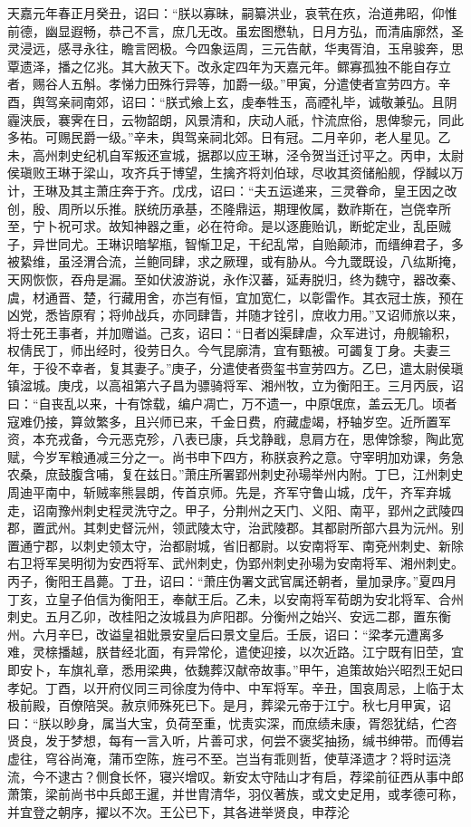 \documentclass[]{article}
\begin{document}
天嘉元年春正月癸丑，诏曰：``朕以寡昧，嗣纂洪业，哀茕在疚，治道弗昭，仰惟前德，幽显遐畅，恭己不言，庶几无改。虽宏图懋轨，日月方弘，而清庙廓然，圣灵浸远，感寻永往，瞻言罔极。今四象运周，三元告献，华夷胥洎，玉帛骏奔，思覃遗泽，播之亿兆。其大赦天下。改永定四年为天嘉元年。鳏寡孤独不能自存立者，赐谷人五斛。孝悌力田殊行异等，加爵一级。''甲寅，分遣使者宣劳四方。辛酉，舆驾亲祠南郊，诏曰：``朕式飨上玄，虔奉牲玉，高禋礼毕，诚敬兼弘。且阴霾浃辰，褰霁在日，云物韶朗，风景清和，庆动人祇，忭流庶俗，思俾黎元，同此多祐。可赐民爵一级。''辛未，舆驾亲祠北郊。日有冠。二月辛卯，老人星见。乙未，高州刺史纪机自军叛还宣城，据郡以应王琳，泾令贺当迁讨平之。丙申，太尉侯瑱败王琳于梁山，攻齐兵于博望，生擒齐将刘伯球，尽收其资储船舰，俘馘以万计，王琳及其主萧庄奔于齐。戊戌，诏曰：``夫五运递来，三灵眷命，皇王因之改创，殷、周所以乐推。朕统历承基，丕隆鼎运，期理攸属，数祚斯在，岂侥幸所至，宁卜祝可求。故知神器之重，必在符命。是以逐鹿贻讥，断蛇定业，乱臣贼子，异世同尤。王琳识暗挈瓶，智惭卫足，干纪乱常，自贻颠沛，而缙绅君子，多被絷维，虽泾渭合流，兰鲍同肆，求之厥理，或有胁从。今九罭既设，八纮斯掩，天网恢恢，吞舟是漏。至如伏波游说，永作汉蕃，延寿脱归，终为魏守，器改秦、虞，材通晋、楚，行藏用舍，亦岂有恒，宜加宽仁，以彰雷作。其衣冠士族，预在凶党，悉皆原宥；将帅战兵，亦同肆眚，并随才铨引，庶收力用。''又诏师旅以来，将士死王事者，并加赠谥。己亥，诏曰：``日者凶渠肆虐，众军进讨，舟舰输积，权倩民丁，师出经时，役劳日久。今气昆廓清，宜有甄被。可蠲复丁身。夫妻三年，于役不幸者，复其妻子。''庚子，分遣使者赍玺书宣劳四方。乙巳，遣太尉侯瑱镇湓城。庚戌，以高祖第六子昌为骠骑将军、湘州牧，立为衡阳王。三月丙辰，诏曰：``自丧乱以来，十有馀载，编户凋亡，万不遗一，中原氓庶，盖云无几。顷者寇难仍接，算敛繁多，且兴师已来，千金日费，府藏虚竭，杼轴岁空。近所置军资，本充戎备，今元恶克殄，八表已康，兵戈静戢，息肩方在，思俾馀黎，陶此宽赋，今岁军粮通减三分之一。尚书申下四方，称朕哀矜之意。守宰明加劝课，务急农桑，庶鼓腹含哺，复在兹日。''萧庄所署郢州刺史孙瑒举州内附。丁巳，江州刺史周迪平南中，斩贼率熊昙朗，传首京师。先是，齐军守鲁山城，戊午，齐军弃城走，诏南豫州刺史程灵洗守之。甲子，分荆州之天门、义阳、南平，郢州之武陵四郡，置武州。其刺史督沅州，领武陵太守，治武陵郡。其都尉所部六县为沅州。别置通宁郡，以刺史领太守，治都尉城，省旧都尉。以安南将军、南兗州刺史、新除右卫将军吴明彻为安西将军、武州刺史，伪郢州刺史孙瑒为安南将军、湘州刺史。丙子，衡阳王昌薨。丁丑，诏曰：``萧庄伪署文武官属还朝者，量加录序。''夏四月丁亥，立皇子伯信为衡阳王，奉献王后。乙未，以安南将军荀朗为安北将军、合州刺史。五月乙卯，改桂阳之汝城县为庐阳郡。分衡州之始兴、安远二郡，置东衡州。六月辛巳，改谥皇祖妣景安皇后曰景文皇后。壬辰，诏曰：``梁孝元遭离多难，灵榇播越，朕昔经北面，有异常伦，遣使迎接，以次近路。江宁既有旧茔，宜即安卜，车旗礼章，悉用梁典，依魏葬汉献帝故事。''甲午，追策故始兴昭烈王妃曰孝妃。丁酉，以开府仪同三司徐度为侍中、中军将军。辛丑，国哀周忌，上临于太极前殿，百僚陪哭。赦京师殊死已下。是月，葬梁元帝于江宁。秋七月甲寅，诏曰：``朕以眇身，属当大宝，负荷至重，忧责实深，而庶绩未康，胥怨犹结，伫咨贤良，发于梦想，每有一言入听，片善可求，何尝不褒奖抽扬，缄书绅带。而傅岩虚往，穹谷尚淹，蒲币空陈，旌弓不至。岂当有乖则哲，使草泽遗才？将时运浇流，今不逮古？侧食长怀，寝兴增叹。新安太守陆山才有启，荐梁前征西从事中郎萧策，梁前尚书中兵郎王暹，并世胄清华，羽仪著族，或文史足用，或孝德可称，并宜登之朝序，擢以不次。王公已下，其各进举贤良，申荐沦
\end{document}
